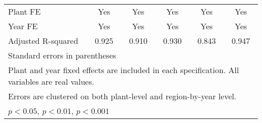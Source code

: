 \begin{table}[htbp]
\begin{tabular}{l*{5}{c}}
Plant FE        &      Yes         &      Yes         &      Yes         &      Yes         &      Yes         \\
Year FE         &      Yes         &      Yes         &      Yes         &      Yes         &      Yes         \\
Adjusted R-squared&    0.925         &    0.910         &    0.930         &    0.843         &    0.947         \\
\bottomrule
\multicolumn{6}{l}{\footnotesize Standard errors in parentheses}\\
\multicolumn{6}{l}{\footnotesize Plant and year fixed effects are included in each specification. All variables are real values.}\\
\multicolumn{6}{l}{\footnotesize Errors are clustered on both plant-level and region-by-year level. }\\
\multicolumn{6}{l}{\footnotesize \sym{*} \(p<0.05\), \sym{**} \(p<0.01\), \sym{***} \(p<0.001\)}\\
\end{tabular}
\end{table}

